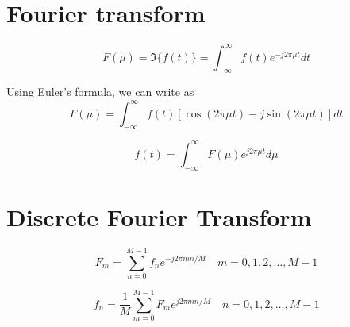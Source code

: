 \section{Fourier transform}

\begin{definition}
    $$F(\mu) = \Im\{f(t)\}=\int_{-\infty}^{\infty} f(t) e^{-j 2 \pi \mu t} d t $$

    Using Euler's formula, we can write as
$$
F(\mu)=\int_{-\infty}^{\infty} f(t)[\cos (2 \pi \mu t)-j \sin (2 \pi \mu t)] d t
$$
\end{definition}

\begin{definition}
    $$ f(t)=\int_{-\infty}^{\infty} F(\mu) e^{j 2 \pi \mu t} d \mu $$
\end{definition}

\section{Discrete Fourier Transform}

\begin{definition}
    $$ F_{m}=\sum_{n=0}^{M-1} f_{n} e^{-j 2 \pi m n / M} \quad m=0,1,2, \ldots, M-1 $$
\end{definition}

\begin{definition}
    $$ f_{n}=\frac{1}{M} \sum_{m=0}^{M-1} F_{m} e^{j 2 \pi m n / M} \quad n=0,1,2, \ldots, M-1 $$
\end{definition}